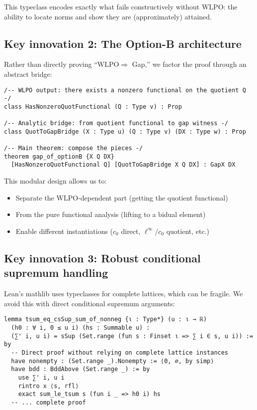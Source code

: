\documentclass[11pt]{article}  %
\newcommand{\WLPO}{\mathrm{WLPO}}
\begin{document}
This typeclass encodes exactly what fails constructively without $\WLPO$: the ability to locate norms and show they are (approximately) attained.

\subsection{Key innovation 2: The Option-B architecture}

Rather than directly proving ``$\WLPO \Rightarrow$ Gap,'' we factor the proof through an abstract bridge:

\begin{lstlisting}[caption={Option-B bridge pattern}]
/-- WLPO output: there exists a nonzero functional on the quotient Q -/
class HasNonzeroQuotFunctional (Q : Type v) : Prop

/-- Analytic bridge: from quotient functional to gap witness -/  
class QuotToGapBridge (X : Type u) (Q : Type v) (DX : Type w) : Prop

/-- Main theorem: compose the pieces -/
theorem gap_of_optionB {X Q DX} 
  [HasNonzeroQuotFunctional Q] [QuotToGapBridge X Q DX] : GapX DX
\end{lstlisting}

This modular design allows us to:
\begin{itemize}
\item Separate the $\WLPO$-dependent part (getting the quotient functional)
\item From the pure functional analysis (lifting to a bidual element)
\item Enable different instantiations ($c_0$ direct, $\ell^\infty/c_0$ quotient, etc.)
\end{itemize}

\subsection{Key innovation 3: Robust conditional supremum handling}

Lean's mathlib uses typeclasses for complete lattices, which can be fragile. We avoid this with direct conditional supremum arguments:

\begin{lstlisting}[caption={Robust csSup for summability}]
lemma tsum_eq_csSup_sum_of_nonneg {ι : Type*} (u : ι → ℝ) 
  (h0 : ∀ i, 0 ≤ u i) (hs : Summable u) :
  (∑' i, u i) = sSup (Set.range (fun s : Finset ι => ∑ i ∈ s, u i)) := by
  -- Direct proof without relying on complete lattice instances
  have nonempty : (Set.range _).Nonempty := ⟨0, ∅, by simp⟩
  have bdd : BddAbove (Set.range _) := by
    use ∑' i, u i
    rintro x ⟨s, rfl⟩
    exact sum_le_tsum s (fun i _ => h0 i) hs
  -- ... complete proof
\end{lstlisting}
\end{document}
